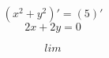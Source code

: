 \documentclass{article}
\begin{document}
    $$ (x^2 + y^2)' = (5)' $$
    $$ 2x + 2y = 0 $$

    $$ lim $$
\end{document}
